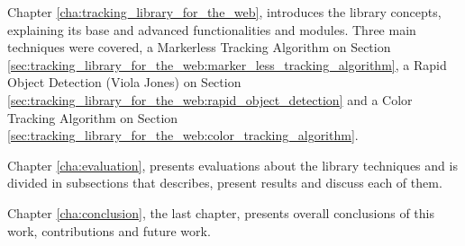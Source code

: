 Chapter \ref{cha:tracking_library_for_the_web}, introduces the library concepts, explaining its base and advanced functionalities and modules. Three main techniques were covered, a Markerless Tracking Algorithm on Section \ref{sec:tracking_library_for_the_web:marker_less_tracking_algorithm}, a Rapid Object Detection (Viola Jones) on Section \ref{sec:tracking_library_for_the_web:rapid_object_detection} and a Color Tracking Algorithm on Section \ref{sec:tracking_library_for_the_web:color_tracking_algorithm}.

Chapter \ref{cha:evaluation}, presents evaluations about the library techniques and is divided in subsections that describes, present results and discuss each of them.

Chapter \ref{cha:conclusion}, the last chapter, presents overall conclusions of this work, contributions and future work.


